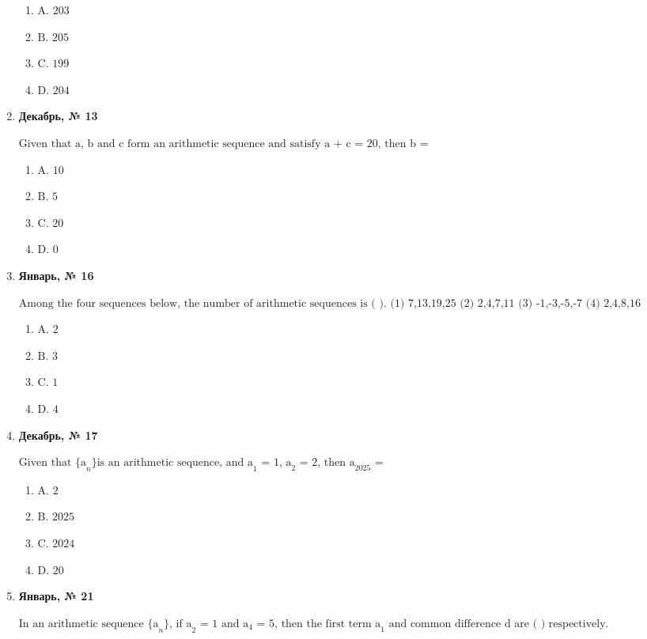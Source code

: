 \begin{enumerate}
\begin{enumerate}
\item $\displaystyle \text{A. 203}$
\item $\displaystyle \text{B. 205}$
\item $\displaystyle \text{C. 199}$
\item $\displaystyle \text{D. 204}$
\end{enumerate}
\item \textbf{Декабрь, № 13} \par \smallskip
$\displaystyle \text{Given that a, b and c form an arithmetic sequence and satisfy a + c = 20, then b =}$
\begin{enumerate}
\item $\displaystyle \text{A. 10}$
\item $\displaystyle \text{B. 5}$
\item $\displaystyle \text{C. 20}$
\item $\displaystyle \text{D. 0}$
\end{enumerate}
\item \textbf{Январь, № 16} \par \smallskip
$\displaystyle \text{Among the four sequences below, the number of arithmetic sequences is ( ).  
  (1) 7,13,19,25  (2) 2,4,7,11   (3) -1,-3,-5,-7    (4) 2,4,8,16}$
\begin{enumerate}
\item $\displaystyle \text{A. 2}$
\item $\displaystyle \text{B. 3}$
\item $\displaystyle \text{C. 1}$
\item $\displaystyle \text{D. 4}$
\end{enumerate}
\item \textbf{Декабрь, № 17} \par \smallskip
$\displaystyle \text{Given that \{a}_{n}\text{\} is an arithmetic sequence, and a}_{1}\text{ = 1, a}_{2}\text{ = 2, then a}_{2025}\text{ =}$
\begin{enumerate}
\item $\displaystyle \text{A. 2}$
\item $\displaystyle \text{B. 2025}$
\item $\displaystyle \text{C. 2024}$
\item $\displaystyle \text{D. 20}$
\end{enumerate}
\item \textbf{Январь, № 21} \par \smallskip
$\displaystyle \text{In an arithmetic sequence \{a}_{n}\text{\}, if a}_{2}\text{ = 1 and a}_{4}\text{ = 5, then the first term a}_{1}\text{ and common difference d are ( ) respectively.}$

\end{enumerate}
